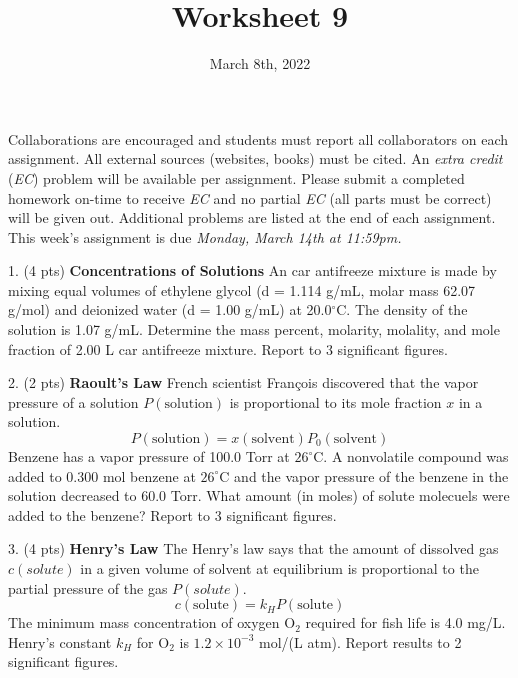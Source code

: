\documentclass[11pt]{article}
\title{\textbf{Worksheet 9}}
\date{\vspace{-2em}March 8th, 2022}
\begin{document}
\maketitle

Collaborations are encouraged and students must report all collaborators
on each assignment. All external sources (websites, books) must be
cited. An \textit{extra credit} (\textit{EC}) problem will be available per
assignment. Please submit a completed homework on-time to receive \textit{EC}
and no partial \textit{EC} (all parts must be correct) will be given out.
Additional problems are listed at the end of each assignment. This week's
assignment is due \textit{Monday, March 14th at 11:59pm.}

1. (4 pts) \textbf{Concentrations of Solutions} An car antifreeze mixture is made by mixing
equal volumes of ethylene glycol (d = 1.114 g/mL, molar mass 62.07 g/mol) and deionized water
(d = 1.00 g/mL) at 20.0$^\circ$C. The density of the solution is 1.07 g/mL. Determine
the mass percent, molarity, molality, and mole fraction of 2.00 L car antifreeze mixture. Report
to 3 significant figures.


\vspace{2in}

2. (2 pts) \textbf{Raoult's Law} French scientist Fran\c{c}ois discovered that the vapor pressure
of a solution $P(\text{solution})$ is proportional to its mole fraction $x$ in a solution.
\begin{equation}
  P(\text{solution}) = x(\text{solvent})P_0(\text{solvent})
\end{equation}
Benzene has a vapor pressure of 100.0 Torr at $26^\circ$C. A nonvolatile compound was added
to 0.300 mol benzene at $26^\circ$C and the vapor pressure of the benzene in the solution
decreased to 60.0 Torr. What amount (in moles) of solute molecuels were added to the benzene?
Report to 3 significant figures.

\vspace{2in}

3. (4 pts) \textbf{Henry's Law} The Henry's law says that the amount of dissolved gas
$c(solute)$ in a given volume of solvent at equilibrium is proportional to the partial
pressure of the gas $P(solute)$. 
\begin{equation}
  c(\text{solute}) = k_HP(\text{solute})
\end{equation}
The minimum mass concentration of oxygen O$_2$ required for fish life is 4.0 mg/L.
Henry's constant $k_H$ for O$_2$ is $1.2\times 10^{-3}$ mol/(L atm). Report results to 2
significant figures.
\end{document}
